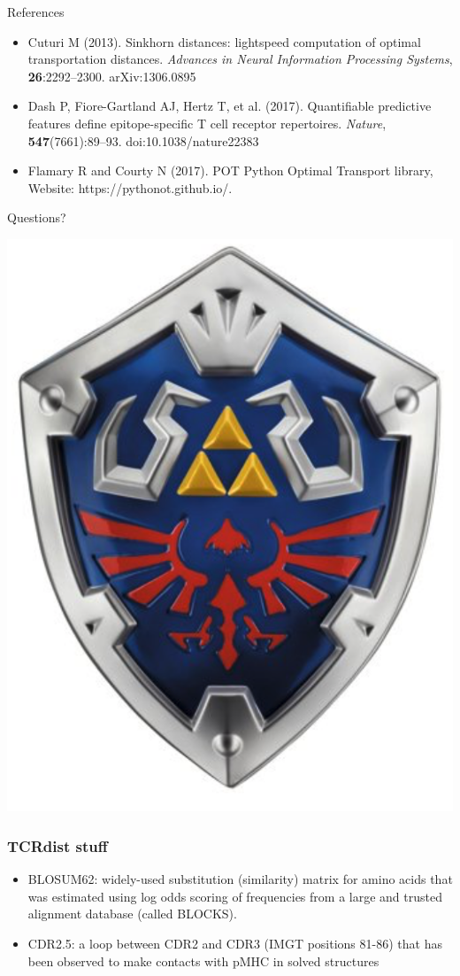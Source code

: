 \documentclass[mathserif,compress,xcolor={dvipsnames}]{beamer}
\renewcommand\;{\,}
\begin{document}
\begin{frame}{References}
\small
\begin{itemize}
\item[]
Cuturi M (2013). Sinkhorn distances: lightspeed computation of optimal transportation distances. {\em Advances in Neural Information Processing Systems}, \textbf{26}:2292--2300. arXiv:1306.0895
\bigskip
\item[]
Dash P, Fiore-Gartland AJ, Hertz T, et al. (2017). Quantifiable predictive features define epitope-specific T cell receptor repertoires. {\em Nature}, \textbf{547}(7661):89--93. doi:10.1038/nature22383
\bigskip
\item[]
Flamary R and Courty N (2017). POT Python Optimal Transport library,
Website: https://pythonot.github.io/.
\end{itemize}
\end{frame}

\begin{frame}
\begin{center}
\Huge
Questions?
\end{center}
\end{frame}

\begin{frame}
\begin{center}
\includegraphics[width=0.5\linewidth]{Images/shield.png}
\end{center}
\end{frame}


\begin{frame}\frametitle{TCRdist stuff}
\begin{itemize}
\item
BLOSUM62: widely-used substitution (similarity) matrix for amino acids that was estimated using log odds scoring of frequencies from a large and trusted alignment database (called BLOCKS).
\bigskip
\item
CDR2.5: a loop between CDR2 and CDR3 (IMGT positions 81-86) that has been observed to make
contacts with pMHC in solved structures
\end{itemize}
\end{frame}
\end{document}
